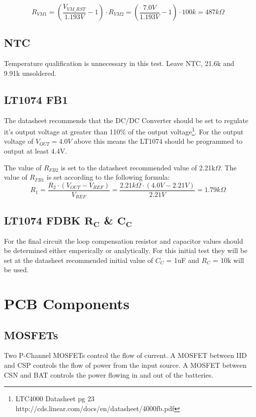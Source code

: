 \documentclass{article}
\begin{document}
\[R_{VM1} = \left (\frac{V_{VM\_RST}}{1.193V}-1\right )\cdot R_{VM2} = \left (\frac{7.0V}{1.193V}-1\right )\cdot 100k = 487k\Omega\]

\subsection{NTC}
Temperature qualification is unnecessary in this test. Leave NTC, 21.6k and 9.91k unsoldered. 

\subsection{LT1074 FB1}
The datasheet recommends that the DC/DC Converter should be set to regulate it's output voltage at greater than 110\% of the output voltage\footnote{LTC4000 Datasheet pg 23 http://cds.linear.com/docs/en/datasheet/4000fb.pdf}. For the output voltage of $V_{OUT} = 4.0V$ above this means the LT1074 should be programmed to output at least 4.4V. 

The value of $R_{FB2}$ is set to the datasheet recommended value of 2.21k$\Omega$. The value of $R_{FB1}$ is set according to the following formula:
\[ R_1 = \frac{R_2 \cdot (V_{OUT} - V_{REF})}{V_{REF}} = \frac{2.21k\Omega \cdot (4.0V - 2.21V)}{2.21V} = 1.79k\Omega\]

\subsection{LT1074 FDBK $\mathbf{R_C}$ \& $\mathbf{C_C}$}
For the final circuit the loop compensation resistor and capacitor values should be determined either emperically or analytically. For this initial test they will be set at the datasheet recommended initial value of $C_C$ = 1uF and $R_C$ = 10k will be used.
\section{PCB Components}

\subsection{MOSFETs}
Two P-Channel MOSFETs control the flow of current. A MOSFET between IID and CSP controls the flow of power from the input source. A MOSFET between CSN and BAT controls the power flowing in and out of the batteries. 
\end{document}
